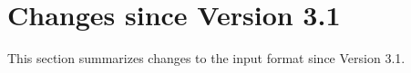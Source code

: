 
\section{Changes since Version 3.1}
This section summarizes changes to the \tahoe input format
since Version 3.1.
